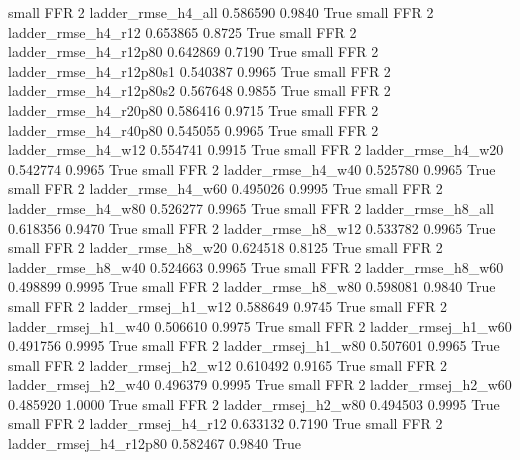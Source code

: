      small      FFR                 2       ladder_rmse_h4_all   0.586590      0.9840    True
     small      FFR                 2       ladder_rmse_h4_r12   0.653865      0.8725    True
     small      FFR                 2    ladder_rmse_h4_r12p80   0.642869      0.7190    True
     small      FFR                 2  ladder_rmse_h4_r12p80s1   0.540387      0.9965    True
     small      FFR                 2  ladder_rmse_h4_r12p80s2   0.567648      0.9855    True
     small      FFR                 2    ladder_rmse_h4_r20p80   0.586416      0.9715    True
     small      FFR                 2    ladder_rmse_h4_r40p80   0.545055      0.9965    True
     small      FFR                 2       ladder_rmse_h4_w12   0.554741      0.9915    True
     small      FFR                 2       ladder_rmse_h4_w20   0.542774      0.9965    True
     small      FFR                 2       ladder_rmse_h4_w40   0.525780      0.9965    True
     small      FFR                 2       ladder_rmse_h4_w60   0.495026      0.9995    True
     small      FFR                 2       ladder_rmse_h4_w80   0.526277      0.9965    True
     small      FFR                 2       ladder_rmse_h8_all   0.618356      0.9470    True
     small      FFR                 2       ladder_rmse_h8_w12   0.533782      0.9965    True
     small      FFR                 2       ladder_rmse_h8_w20   0.624518      0.8125    True
     small      FFR                 2       ladder_rmse_h8_w40   0.524663      0.9965    True
     small      FFR                 2       ladder_rmse_h8_w60   0.498899      0.9995    True
     small      FFR                 2       ladder_rmse_h8_w80   0.598081      0.9840    True
     small      FFR                 2      ladder_rmsej_h1_w12   0.588649      0.9745    True
     small      FFR                 2      ladder_rmsej_h1_w40   0.506610      0.9975    True
     small      FFR                 2      ladder_rmsej_h1_w60   0.491756      0.9995    True
     small      FFR                 2      ladder_rmsej_h1_w80   0.507601      0.9965    True
     small      FFR                 2      ladder_rmsej_h2_w12   0.610492      0.9165    True
     small      FFR                 2      ladder_rmsej_h2_w40   0.496379      0.9995    True
     small      FFR                 2      ladder_rmsej_h2_w60   0.485920      1.0000    True
     small      FFR                 2      ladder_rmsej_h2_w80   0.494503      0.9995    True
     small      FFR                 2      ladder_rmsej_h4_r12   0.633132      0.7190    True
     small      FFR                 2   ladder_rmsej_h4_r12p80   0.582467      0.9840    True
